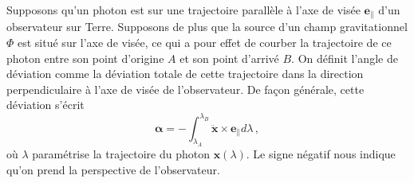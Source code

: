 Supposons qu'un photon est sur une trajectoire parallèle à l'axe de 
visée $\mathbf{e}_{\parallel}$ d'un observateur sur Terre. 
Supposons de plus que la source d'un champ gravitationnel $\Phi$ est situé sur l'axe de visée, 
ce qui a pour effet de courber la 
trajectoire de ce photon entre son point d'origine $A$ et son point d'arrivé $B$.
On définit l'angle de déviation comme la déviation totale de cette trajectoire 
dans la direction perpendiculaire à l'axe de visée de l'observateur. 
De façon générale, cette déviation s'écrit
\begin{equation}\label{eq:intro alpha}
        \boldsymbol{ \alpha} = - \int_{\lambda_A}^{\lambda_B} \ddot{\mathbf{x}} \times \mathbf{e}_{\parallel} d\lambda\, ,
\end{equation}
où $\lambda$ paramétrise la trajectoire du photon $\mathbf{x}(\lambda)$. 
Le signe négatif nous indique qu'on prend la perspective de l'observateur. 


